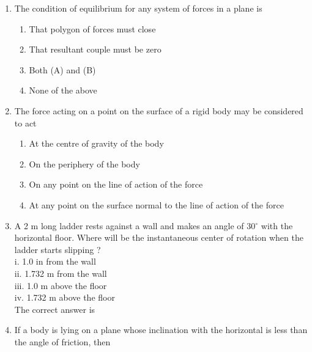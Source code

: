 \documentclass[11pt,a4paper]{article}
\begin{document}
\begin{enumerate}
\item{The condition of equilibrium for any system of forces in a plane is}
\begin{enumerate}[label=\Alph*.]
\item{That polygon of forces must close}
\item{That resultant couple must be zero}
\item{Both (A) and (B)}
\item{None of the above}
\end{enumerate}
\item{The force acting on a point on the surface of a rigid body may be considered to act}
\begin{enumerate}[label=\Alph*.]
\item{At the centre of gravity of the body}
\item{On the periphery of the body}
\item{On any point on the line of action of the force}
\item{At any point on the surface normal to the line of action of the force}
\end{enumerate}
\item{A 2 m long ladder rests against a wall and makes an angle of 30$^\circ$ with the horizontal floor. Where will be the instantaneous center of rotation when the ladder starts slipping ? \\

i. 1.0 in from the wall \\

ii. 1.732 m from the wall \\

iii. 1.0 m above the floor \\

iv. 1.732 m above the floor \\

The correct answer is
}
\\
\item{If a body is lying on a plane whose inclination with the horizontal is less than the angle of friction, then \\

}
\end{enumerate}
\end{document}
